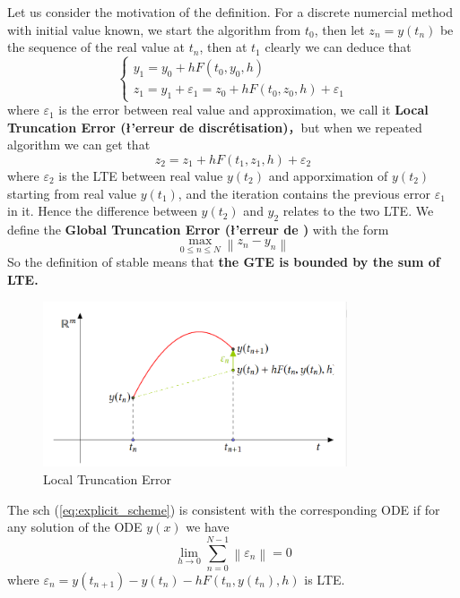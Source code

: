 \documentclass[en,hazy,black,pc,12pt]{elegantnote}
\begin{document}
\begin{remark}
    Let us consider the motivation of the definition. For a discrete numercial method with initial value known, we start the algorithm from \(t_0\), then let \(z_n = y(t_n)\) be the sequence of the real value at \(t_n\), then at \(t_1\) clearly we can deduce that 
    \[\begin{cases}
        y_1 = y_0 + h F(t_0,y_0,h) \\
        z_1 = y_1 + \varepsilon_1 = z_0 + h F(t_0,z_0,h) + \varepsilon_1
    \end{cases}\]
    where \(\varepsilon_1\) is the error between real value and approximation, we call it \textbf{Local Truncation Error (\l'erreur de discrétisation)}，but when we repeated algorithm we can get that
    \[z_2 = z_1 + h F(t_1,z_1,h) + \varepsilon_2\]
    where \(\varepsilon_2\) is the LTE between  real value \(y(t_2)\) and apporximation of \(y(t_2)\) starting from real value \(y(t_1)\), and the iteration contains the previous error \(\varepsilon_1\) in it. Hence the difference between \(y(t_2)\) and \(y_2\) relates to the two LTE. We define the\textbf{ Global Truncation Error (\l'erreur de \sch)} with the form
    \[\max _{0 \leq n \leq N}\left\|z_n-y_n\right\|\]
    So the definition of stable \sch means that \textbf{the GTE is bounded by the sum of LTE.}
    \begin{figure}[h]
        \centering
        \includegraphics[width=0.8\textwidth]{fig/stable.png}
        \caption{Local Truncation Error}
    \end{figure}
\end{remark}

\begin{definition}[Consistent]
    The sch (\ref{eq:explicit_scheme}) is consistent with the corresponding ODE if for any solution of the ODE \(y(x)\) we have 
    \[
\lim _{h \rightarrow 0} \sum_{n=0}^{N-1}\left\|\varepsilon_n\right\|=0
\]
where \(\varepsilon_n = y(t_{n+1}) - y(t_n)-hF(t_n,y(t_n),h)\) is LTE.
\end{definition} 
\end{document}
